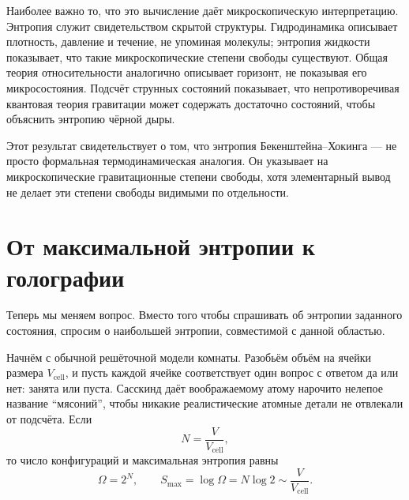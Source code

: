 Наиболее важно то, что это вычисление даёт микроскопическую интерпретацию. Энтропия служит свидетельством скрытой структуры. Гидродинамика описывает плотность, давление и течение, не упоминая молекулы; энтропия жидкости показывает, что такие микроскопические степени свободы существуют. Общая теория относительности аналогично описывает горизонт, не показывая его микросостояния. Подсчёт струнных состояний показывает, что непротиворечивая квантовая теория гравитации может содержать достаточно состояний, чтобы объяснить энтропию чёрной дыры.

\begin{classroomqa}
\end{classroomqa}

Этот результат свидетельствует о том, что энтропия Бекенштейна--Хокинга — не просто формальная термодинамическая аналогия. Он указывает на микроскопические гравитационные степени свободы, хотя элементарный вывод не делает эти степени свободы видимыми по отдельности.

\section{От максимальной энтропии к голографии}

Теперь мы меняем вопрос. Вместо того чтобы спрашивать об энтропии заданного состояния, спросим о наибольшей энтропии, совместимой с данной областью.

Начнём с обычной решёточной модели комнаты. Разобьём объём на ячейки размера \(V_{\mathrm{cell}}\), и пусть каждой ячейке соответствует один вопрос с ответом да или нет: занята или пуста. Сасскинд даёт воображаемому атому нарочито нелепое название ``мясоний'', чтобы никакие реалистические атомные детали не отвлекали от подсчёта. Если
\begin{equation}
N=\frac{V}{V_{\mathrm{cell}}},
\end{equation}
то число конфигураций и максимальная энтропия равны
\begin{equation}
\Omega=2^N,
\qquad
S_{\max}=\log\Omega=N\log2
\sim\frac{V}{V_{\mathrm{cell}}}.
\label{eq:l07-volume-count}
\end{equation}

